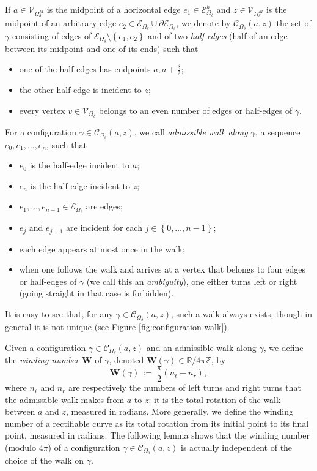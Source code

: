 \documentclass[oneside,english]{amsart}
\numberwithin{equation}{section}
\numberwithin{figure}{section}
\theoremstyle{plain}
\theoremstyle{plain}
\theoremstyle{plain}
\theoremstyle{plain}
\theoremstyle{plain}
\theoremstyle{definition}
\theoremstyle{remark}
\begin{document}
If $a\in\mathcal{V}_{\Omega_{\delta}^{M}}$ is the midpoint of a horizontal
edge $e_{1}\in\mathcal{E}_{\Omega_{\delta}}^{h}$ and $z\in\mathcal{V}_{\Omega_{\delta}^{M}}$
is the midpoint of an arbitrary edge $e_{2}\in\mathcal{E}_{\Omega_{\delta}}\cup\partial\mathcal{E}_{\Omega_{\delta}}$,
we denote by $\mathcal{C}_{\Omega_{\delta}}\left(a,z\right)$ the
set of $\gamma$ consisting of edges of $\mathcal{E}_{\Omega_{\delta}}\setminus\left\{ e_{1},e_{2}\right\} $
and of two \emph{half-edges} (half of an edge between its midpoint
and one of its ends) such that
\begin{itemize}
\item one of the half-edges has endpoints $a,a+\frac{\delta}{2}$;
\item the other half-edge is incident to $z$;
\item every vertex $v\in\mathcal{V}_{\Omega_{\delta}}$ belongs to an even
number of edges or half-edges of $\gamma$.
\end{itemize}
For a configuration $\gamma\in\mathcal{C}_{\Omega_{\delta}}\left(a,z\right)$,
we call \emph{admissible walk along $\gamma$}, a sequence $e_{0},e_{1},\ldots,e_{n}$,
such that 
\begin{itemize}
\item $e_{0}$ is the half-edge incident to $a$;
\item $e_{n}$ is the half-edge incident to $z$;
\item $e_{1},\ldots,e_{n-1}\in\mathcal{E}_{\Omega_{\delta}}$ are edges;
\item $e_{j}$ and $e_{j+1}$ are incident for each $j\in\left\{ 0,\ldots,n-1\right\} $;
\item each edge appears at most once in the walk;
\item when one follows the walk and arrives at a vertex that belongs to
four edges or half-edges of $\gamma$ (we call this an \emph{ambiguity}),
one either turns left or right (going straight in that case is forbidden).
\end{itemize}
It is easy to see that, for any $\gamma\in\mathcal{C}_{\Omega_{\delta}}\left(a,z\right)$,
such a walk always exists, though in general it is not unique (see
Figure \ref{fig:configuration-walk}).

Given a configuration $\gamma\in\mathcal{C}_{\Omega_{\delta}}\left(a,z\right)$
and an admissible walk along $\gamma$, we define the \emph{winding
number} $\mathbf{W}$ of $\gamma$, denoted $\mathbf{W}\left(\gamma\right)\in\mathbb{R}/4\pi\mathbb{Z}$,
by 
\[
\mathbf{W}\left(\gamma\right)\,:=\,\frac{\pi}{2}\left(n_{\ell}-n_{r}\right),
\]
where $n_{\ell}$ and $n_{r}$ are respectively the numbers of left
turns and right turns that the admissible walk makes from $a$ to
$z$: it is the total rotation of the walk between $a$ and $z$,
measured in radians. More generally, we define the winding number
of a rectifiable curve as its total rotation from its initial point
to its final point, measured in radians. The following lemma shows
that the winding number (modulo $4\pi$) of a configuration $\gamma\in\mathcal{C}_{\Omega_{\delta}}\left(a,z\right)$
is actually independent of the choice of the walk on $\gamma$.
\end{document}
